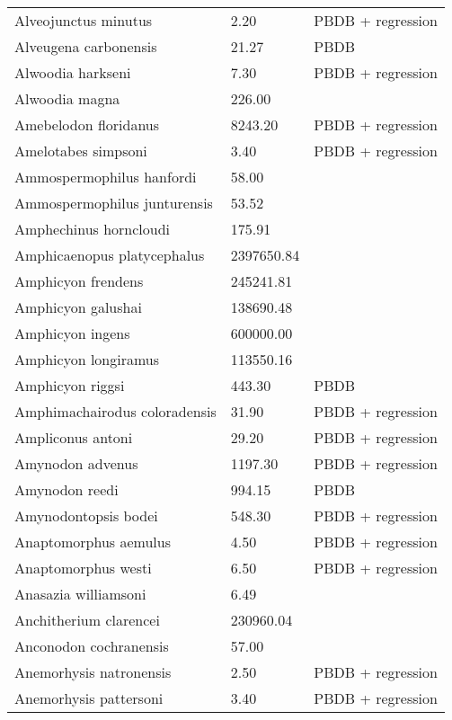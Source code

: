 \documentclass{article}
\begin{document}
\begin{center}
\begin{longtable}{p{} p{} p{}}
    Alveojunctus minutus & 2.20 & PBDB + regression \\ 
    Alveugena carbonensis & 21.27 & PBDB \\ 
    Alwoodia harkseni & 7.30 & PBDB + regression \\ 
    Alwoodia magna & 226.00 & \cite{McKenna2011} \\ 
    Amebelodon floridanus & 8243.20 & PBDB + regression \\ 
    Amelotabes simpsoni & 3.40 & PBDB + regression \\ 
    Ammospermophilus hanfordi & 58.00 & \cite{McKenna2011} \\ 
    Ammospermophilus junturensis & 53.52 & \cite{Tomiya2013} \\ 
    Amphechinus horncloudi & 175.91 & \cite{Tomiya2013} \\ 
    Amphicaenopus platycephalus & 2397650.84 & \cite{Tomiya2013} \\ 
    Amphicyon frendens & 245241.81 & \cite{Tomiya2013} \\ 
    Amphicyon galushai & 138690.48 & \cite{Tomiya2013} \\ 
    Amphicyon ingens & 600000.00 & \cite{Sorkin2008} \\ 
    Amphicyon longiramus & 113550.16 & \cite{Tomiya2013} \\ 
    Amphicyon riggsi & 443.30 & PBDB \\ 
    Amphimachairodus coloradensis & 31.90 & PBDB + regression \\ 
    Ampliconus antoni & 29.20 & PBDB + regression \\ 
    Amynodon advenus & 1197.30 & PBDB + regression \\ 
    Amynodon reedi & 994.15 & PBDB \\ 
    Amynodontopsis bodei & 548.30 & PBDB + regression \\ 
    Anaptomorphus aemulus & 4.50 & PBDB + regression \\ 
    Anaptomorphus westi & 6.50 & PBDB + regression \\ 
    Anasazia williamsoni & 6.49 & \cite{Williamson2012} \\ 
    Anchitherium clarencei & 230960.04 & \cite{Tomiya2013} \\ 
    Anconodon cochranensis & 57.00 & \cite{Wilson2012} \\ 
    Anemorhysis natronensis & 2.50 & PBDB + regression \\ 
    Anemorhysis pattersoni & 3.40 & PBDB + regression \\ 

\end{longtable}
\end{center}
\end{document}
